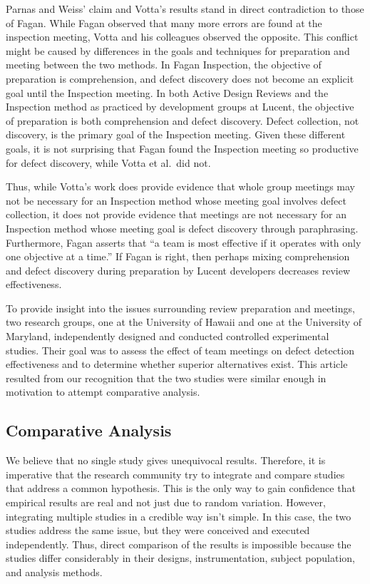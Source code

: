 Parnas and Weiss' claim and Votta's results stand in direct contradiction 
to those of Fagan.  While Fagan observed that many more errors are found at the
inspection meeting, Votta and his colleagues observed the opposite. 
This conflict might be caused by differences in the goals
and techniques for preparation and meeting between the two methods.  In
Fagan Inspection, the objective of preparation is comprehension, and defect
discovery does not become an explicit goal until the Inspection meeting. In
both Active Design Reviews and the Inspection method as practiced by development
groups at Lucent, the objective of preparation is both comprehension and
defect discovery. Defect collection, not discovery, is the primary goal
of the Inspection meeting.  Given these different goals, it is not
surprising that Fagan found the Inspection meeting so productive for defect
discovery, while Votta et al.~did not.

Thus, while Votta's work does provide evidence that whole group meetings
may not be necessary for an Inspection method whose meeting goal involves
defect collection, it does not provide evidence that meetings are not
necessary for an Inspection method whose meeting goal is defect discovery
through paraphrasing. Furthermore, Fagan asserts that ``a team is most
effective if it operates with only one objective at a time.''  If Fagan is
right, then perhaps mixing comprehension and defect discovery during
preparation by Lucent developers decreases review effectiveness.

To provide insight into the issues surrounding review preparation and
meetings, two research groups, one at the 
University of Hawaii and one at the University of Maryland, independently
designed and conducted controlled experimental studies. Their goal was 
to assess the effect of team meetings on defect detection effectiveness 
and to determine whether superior alternatives exist.  This article 
resulted from our recognition that the two studies were similar enough 
in motivation to attempt comparative analysis.

\subsection{Comparative Analysis}
\label{companal}

We believe that no single study gives unequivocal results.
Therefore, it is imperative that the research community try 
to integrate and compare
studies that address a common hypothesis. This is the only way to gain 
confidence that empirical results are real and not just due to random 
variation. However, integrating multiple studies in a credible way isn't
simple. In this case, the two studies address the same issue, but they were 
conceived and executed independently. Thus, direct comparison of the results
is impossible because the studies differ considerably in their designs, 
instrumentation, subject population, and analysis methods.
 
